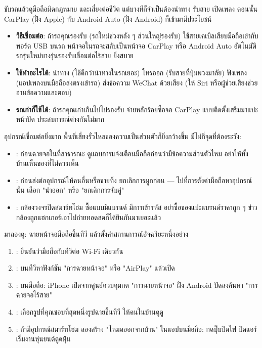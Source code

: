 
ขับรถแล้วดูมือถือผิดกฎหมาย และเสี่ยงต่อชีวิต แต่บางทีก็จำเป็นต้องนำทาง รับสาย เปิดเพลง ตอนนั้น CarPlay (ฝั่ง Apple) กับ Android Auto (ฝั่ง Android) ก็เข้ามามีประโยชน์

\begin{itemize}
  \item \textbf{วิธีเชื่อมต่อ}: ถ้ารถคุณรองรับ (รถใหม่ช่วงหลัง ๆ ส่วนใหญ่รองรับ) ใช้สายเคเบิลเสียบมือถือเข้ากับพอร์ต USB บนรถ หน้าจอในรถจะสลับเป็นหน้าจอ CarPlay หรือ Android Auto อัตโนมัติ รถรุ่นใหม่บางรุ่นรองรับเชื่อมต่อไร้สาย ยิ่งสบาย
  \item \textbf{ใช้ทำอะไรได้}: นำทาง (ใช้ดีกว่านำทางในรถเยอะ) โทรออก (รับสายที่ปุ่มพวงมาลัย) ฟังเพลง (แอปเพลงบนมือถือส่งตรงเข้ารถ) ส่งข้อความ WeChat ด้วยเสียง (ให้ Siri หรือผู้ช่วยเสียงช่วยอ่านข้อความและตอบ)
  \item \textbf{รถเก่าก็ใช้ได้}: ถ้ารถคุณเก่าเกินไปไม่รองรับ จ่ายหลักร้อยซื้อจอ CarPlay แบบติดตั้งเสริมมาแปะหน้าปัด ประสบการณ์ต่างกันไม่มาก
\end{itemize}


อุปกรณ์เชื่อมต่อยิ่งมาก พื้นที่เสี่ยงรั่วไหลของความเป็นส่วนตัวก็ยิ่งกว้างขึ้น มีไม่กี่จุดที่ต้องระวัง:

\begin{itemize}
  \item : ก่อนฉายจอในที่สาธารณะ ดูแถบการแจ้งเตือนมือถือก่อนว่ามีข้อความส่วนตัวไหม อย่าให้ทั้งบ้านเห็นของที่ไม่ควรเห็น
  \item : ก่อนส่งต่ออุปกรณ์ให้คนอื่นหรือขายทิ้ง ยกเลิกการผูกก่อน — ไปที่การตั้งค่ามือถือหาอุปกรณ์นั้น เลือก "นำออก" หรือ "ยกเลิกการจับคู่"
  \item : กล้องวงจรปิดสมาร์ทโฮม ซื้อแบบมีแบรนด์ มีการเข้ารหัส อย่าซื้อของแปะแบรนด์ราคาถูก ๆ ข่าวกล้องถูกแฮกเกอร์เอาไปถ่ายทอดสดก็ได้ยินกันมาเยอะแล้ว
\end{itemize}

\begin{tcbpractice}{มาลองดู: ฉายหน้าจอมือถือขึ้นทีวี แล้วตั้งค่าสถานการณ์อัจฉริยะหนึ่งอย่าง}
\begin{enumerate}
  \item : ยืนยันว่ามือถือกับทีวีต่อ Wi-Fi เดียวกัน
  \item : บนทีวีหาฟังก์ชัน "การฉายหน้าจอ" หรือ "AirPlay" แล้วเปิด
  \item : บนมือถือ: iPhone เปิดจากศูนย์ควบคุมกด "การฉายหน้าจอ" ฝั่ง Android ปัดลงค้นหา "การฉายจอไร้สาย"
  \item : เลือกรูปที่คุณชอบที่สุดหนึ่งรูปฉายขึ้นทีวี ให้คนในบ้านดูดู
  \item : ถ้ามีอุปกรณ์สมาร์ทโฮม ลองสร้าง "โหมดออกจากบ้าน" ในแอปบนมือถือ: กดปุ๊บปิดไฟ ปิดแอร์ เริ่มงานหุ่นยนต์ดูดฝุ่น
\end{enumerate}

\end{tcbpractice}

